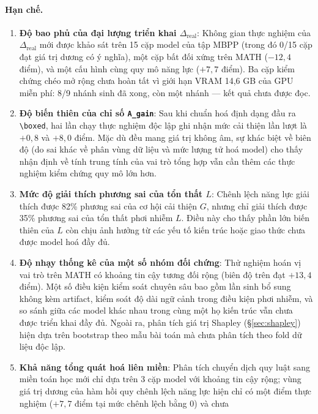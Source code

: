 \documentclass[11pt,a4paper]{article}
\newcommand{\dhonest}{\Delta_{\mathrm{real}}}
\begin{document}
\paragraph{Hạn chế.}
\begin{enumerate}\itemsep2pt
\item \textbf{Độ bao phủ của đại lượng triển khai $\dhonest$}: Không gian thực nghiệm của $\dhonest$
      mới được khảo sát trên 15 cặp model của tập MBPP (trong đó 0/15 cặp đạt giá trị dương có ý
      nghĩa), một cặp bất đối xứng trên MATH ($-12{,}4$ điểm), và một cấu hình cùng quy mô năng lực
      ($+7{,}7$ điểm). Ba cặp kiểm chứng chéo mở rộng chưa hoàn tất vì giới hạn VRAM 14,6 GB của
      GPU miễn phí: 8/9 nhánh sinh đã xong, còn một nhánh --- kết quả chưa được đọc.
\item \textbf{Độ biến thiên của chỉ số \texttt{A\_gain}}: Sau khi chuẩn hoá định dạng đầu ra
      \verb|\boxed|, hai lần chạy thực nghiệm độc lập ghi nhận mức cải thiện lần lượt là $+0{,}8$
      và $+8{,}0$ điểm. Mặc dù đều mang giá trị không âm, sự khác biệt về biên độ (do sai khác về
      phân vùng dữ liệu và mức lượng tử hoá model) cho thấy nhận định về tính trung tính của vai trò
      tổng hợp vẫn cần thêm các thực nghiệm kiểm chứng quy mô lớn hơn.
\item \textbf{Mức độ giải thích phương sai của tổn thất $L$}: Chênh lệch năng lực giải thích được
      82\% phương sai của cơ hội cải thiện $G$, nhưng chỉ giải thích được 35\% phương sai của tổn thất phơi
      nhiễm $L$. Điều này cho thấy phần lớn biến thiên của $L$ còn chịu ảnh hưởng từ các yếu tố kiến
      trúc hoặc giao thức chưa được model hoá đầy đủ.
\item \textbf{Độ nhạy thống kê của một số nhóm đối chứng}: Thử nghiệm hoán vị vai trò trên MATH có
      khoảng tin cậy tương đối rộng (biên độ trên đạt $+13{,}4$ điểm). Một số điều kiện kiểm soát
      chuyên sâu bao gồm lần sinh bổ sung không kèm artifact, kiểm soát độ dài ngữ cảnh trong
      điều kiện phơi nhiễm, và so sánh giữa các model khác nhau trong cùng một họ kiến trúc vẫn
      chưa được triển khai đầy đủ. Ngoài ra, phân tích giá trị Shapley (\S\ref{sec:shapley}) hiện dựa
      trên bootstrap theo mẫu bài toán mà chưa phân tích theo fold dữ liệu độc lập.
\item \textbf{Khả năng tổng quát hoá liên miền}: Phân tích chuyển dịch quy luật sang miền toán học
      mới chỉ dựa trên 3 cặp model với khoảng tin cậy rộng; vùng giá trị dương của hàm hồi quy chênh
      lệch năng lực hiện chỉ có một điểm thực nghiệm ($+7{,}7$ điểm tại mức chênh lệch bằng 0) và chưa

\end{enumerate}
\end{document}
